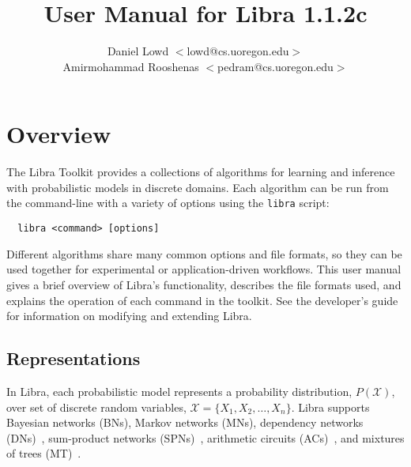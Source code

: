 \documentclass[11pt]{article}
\title{User Manual for Libra 1.1.2c}
\author{Daniel Lowd $<$lowd@cs.uoregon.edu$>$ \\
Amirmohammad Rooshenas $<$pedram@cs.uoregon.edu$>$}
\begin{document}
\maketitle

\section{Overview}

The Libra Toolkit provides a collections of algorithms for learning
and inference with probabilistic models in discrete domains.  Each
algorithm can be run from the command-line with a variety of options
using the {\tt libra} script:
\begin{verbatim}
  libra <command> [options]
\end{verbatim}
Different algorithms share many common options and file formats, so they
can be used together for experimental or application-driven workflows.
This user manual gives a brief overview of Libra's functionality,
describes the file formats used, and explains the operation of each
command in the toolkit.  See the developer's guide for information on
modifying and extending Libra.

\subsection{Representations}

In Libra, each probabilistic model represents a probability
distribution, $P(\mathcal{X})$, over set of discrete random variables,
$\mathcal{X} = \{X_1, X_2, \ldots, X_n\}$.  Libra supports Bayesian
networks (BNs), Markov networks (MNs), dependency networks
(DNs)~\cite{heckerman&al00}, sum-product networks
(SPNs)~\cite{poon&domingos11}, arithmetic circuits
(ACs)~\cite{darwiche03}, and mixtures of trees
(MT)~\cite{meila&jordan00}.

\end{document}
